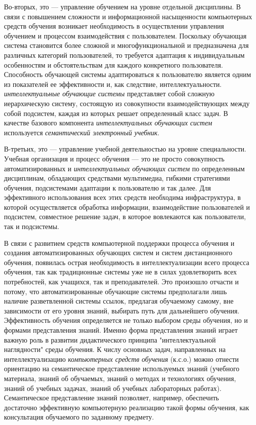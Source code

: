 Во-вторых, это --- управление обучением на уровне отдельной дисциплины. В связи с повышением сложности и информационной насыщенности компьютерных средств обучения возникает необходимость в осуществлении управления обучением и процессом взаимодействия с пользователем. Поскольку обучающая система становится более сложной и многофункциональной и предназначена для различных категорий пользователей, то требуется адаптация к индивидуальным особенностям и обстоятельствам для каждого конкретного пользователя. Способность обучающей системы адаптироваться к пользователю является одним из показателей ее эффективности и, как следствие, интеллектуальности. \textit{интеллектуальные обучающие системы} представляет собой сложную иерархическую систему, состоящую из совокупности взаимодействующих между собой подсистем, каждая из которых решает определенный класс задач. В качестве базового компонента \textit{интеллектуальных обучающих систем} используется \textit{семантический электронный учебник}.

В-третьих, это --- управление учебной деятельностью на уровне специальности. Учебная организация и процесс обучения --- это не просто совокупность автоматизированных и \textit{интеллектуальных обучающих систем} по определенным дисциплинам, обладающих средствами мультимедиа, гибкими стратегиями обучения, подсистемами адаптации к пользователю и так далее. Для эффективного использования всех этих средств необходима инфраструктура, в которой осуществляется обработка информации, взаимодействие пользователей и подсистем, совместное решение задач, в которое вовлекаются как пользователи, так и подсистемы.

В связи с развитием средств компьютерной поддержки процесса обучения и создания автоматизированных обучающих систем и систем дистанционного обучения, появилась острая необходимость в интеллектуализации всего процесса обучения, так как традиционные системы уже не в силах удовлетворить всех потребностей, как учащихся, так и преподавателей. Это произошло отчасти и потому, что автоматизированные обучающие системы предполагали лишь наличие разветвленной системы ссылок, предлагая обучаемому самому, вне зависимости от его уровня знаний, выбирать путь для дальнейшего обучения. Эффективность обучения определяется не только выбором среды обучения, но и формами представления знаний. Именно форма представления знаний играет важную роль в развитии дидактического принципа "интеллектуальной наглядности"{} среды обучения. К числу основных задач, направленных на интеллектуализацию \textit{компьютерных средств обучения} (к.с.о.) можно отнести ориентацию на семантическое представление используемых знаний (учебного материала, знаний об обучаемых, знаний о методах и технологиях обучения, знаний об учебных задачах, знаний об учебных лабораторных работах). Семантическое представление знаний позволяет, например, обеспечить достаточно эффективную компьютерную реализацию такой формы обучения, как консультация обучаемого по заданному предмету.

